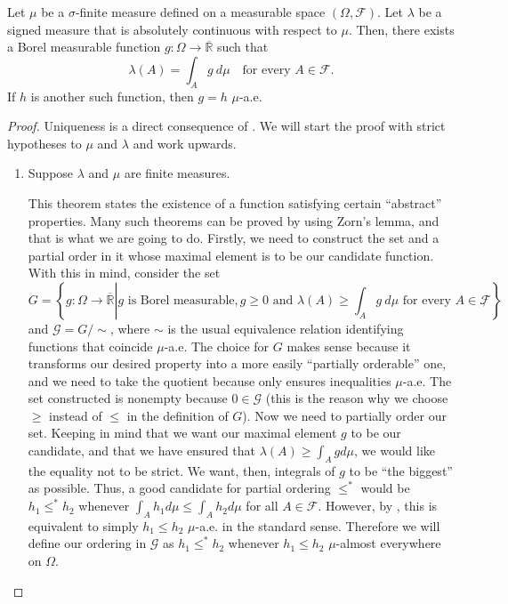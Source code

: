 \begin{thrm}\label{theorem:Radon-Nikodym} Let \(\mu\) be a \(\sigma\)-finite
measure defined on a measurable space \(\left(\Omega,\mathcal{F}\right)\). Let
\(\lambda\) be a signed measure that is absolutely continuous with respect to
\(\mu\). Then, there exists a Borel measurable function
\(g\colon\Omega\to\overline{\mathbb{R}}\) such that
	\[ \lambda(A)=\int_{A}g~d\mu \text{ ~~for every } A\in\mathcal{F}.
	\] If \(h\) is another such function, then \(g=h\) \(\mu\)-a.e.
\end{thrm}

\begin{proof} Uniqueness is a direct consequence of .  We will start the proof with strict
hypotheses to \(\mu\) and \(\lambda\) and work upwards.
	\begin{enumerate}
		\item \label{proof:Radon-Nikodym 1} Suppose \(\lambda\) and \(\mu\) are
finite measures.
		
This theorem states
the existence of a function satisfying certain ``abstract'' properties. Many
such theorems can be proved by using Zorn's lemma, and that is what we are going
to do.  Firstly, we need to construct the set and a partial order in it whose
maximal element is to be our candidate function. With this in mind, consider the
set
		\[ G=\left\{g\colon\Omega\to\overline{\mathbb{R}}\left| g \text{ is
Borel measurable}, g\geq0 \text{ and } \lambda(A)\geq\int_{A}g~d\mu \text{ for
every } A\in\mathcal{F}\right.\right\},
		\] and \(\mathcal{G}=G/{\sim}\), where \(\sim\) is the usual equivalence
relation identifying functions that coincide \(\mu\)-a.e. The choice for \(G\)
makes sense because it transforms our desired property into a more easily
``partially orderable'' one, and we need to take the quotient because
 only ensures
inequalities \(\mu\)-a.e. The set constructed is nonempty because
\(0\in\mathcal{G}\) (this is the reason why we choose \(\geq\) instead of
\(\leq\) in the definition of \(G\)). Now we need to partially order our set.
Keeping in mind that we want our maximal element \(g\) to be our candidate, and
that we have ensured that \(\lambda(A)\geq\int_{A}gd\mu\), we would like the
equality not to be strict. We want, then, integrals of \(g\) to be ``the
biggest'' as possible. Thus, a good candidate for partial ordering \(\leq^{*}\)
would be \(h_{1}\leq^{*} h_{2}\) whenever
\(\int_{A}h_{1}d\mu\leq\int_{A}h_{2}d\mu\) for all \(A\in\mathcal{F}\). However, by
, this is equivalent to
simply \(h_{1}\leq h_{2}\) \(\mu\)-a.e. in the standard sense. Therefore we will
define our ordering in \(\mathcal{G}\) as \(h_{1}\leq^{*}h_{2}\) whenever
\(h_{1}\leq h_{2}\) \(\mu\)-almost everywhere on \(\Omega\).
		

\end{enumerate}
\end{proof}
